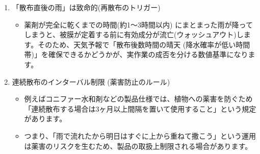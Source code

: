 \documentclass[a4paper, 11pt]{jsarticle}
\begin{document}
\begin{enumerate}
    \item 「散布直後の雨」は致命的(再散布のトリガー)
    \begin{itemize}
        \item[○] 薬剤が完全に乾くまでの時間(約1〜3時間以内) にまとまった雨が降ってしまうと、被膜が定着する前に有効成分が流亡(ウォッシュアウト)します。そのため、天気予報で「散布後数時間の晴天 (降水確率が低い時間帯)」を確保できるかどうかが、実作業の成否を分ける数値基準になります。
    \end{itemize}
    \item 連続散布のインターバル制限 (薬害防止のルール)
    \begin{itemize}
        \item[○] 例えばコニファー水和剤などの製品仕様では、植物への薬害を防ぐため「連続散布する場合は3ヶ月以上間隔を置いて使用すること」という規定があります\cite{ref15}。
        \item[○] つまり、「雨で流れたから明日はすぐに上から重ねて撒こう」という運用は薬害のリスクを生むため、製品の取扱上制限される場合があります。
    \end{itemize}
\end{enumerate}
\end{document}
